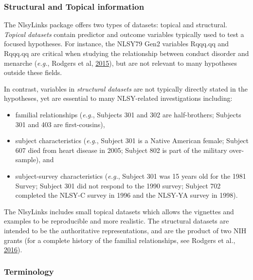 \documentclass[smallextended]{svjour3}       %
\providecommand{\tightlist}{%
  \setlength{\itemsep}{0pt}\setlength{\parskip}{0pt}}
\begin{document}
\hypertarget{structural-and-topical-information}{%
\subsubsection{Structural and Topical
information}\label{structural-and-topical-information}}

The NlsyLinks package offers two types of datasets: topical and
structural. \emph{Topical datasets} contain predictor and outcome
variables typically used to test a focused hypotheses. For instance, the
NLSY79 Gen2 variables Rqqq.qq and Rqqq.qq are critical when studying the
relationship between conduct disorder and menarche (\emph{e.g.}, Rodgers
et al,
\href{http://link.springer.com/article/10.1007/s10519-014-9676-4}{2015}),
but are not relevant to many hypotheses outside these fields.

In contrast, variables in \emph{structural datasets} are not typically
directly stated in the hypotheses, yet are essential to many
NLSY-related investigations including:

\begin{itemize}
\tightlist
\item
  familial relationships (\emph{e.g.}, Subjects 301 and 302 are
  half-brothers; Subjects 301 and 403 are first-cousins),
\item
  subject characteristics (\emph{e.g.}, Subject 301 is a Native American
  female; Subject 607 died from heart disease in 2005; Subject 802 is
  part of the military over-sample), and
\item
  subject-survey characteristics (\emph{e.g.}, Subject 301 was 15 years
  old for the 1981 Survey; Subject 301 did not respond to the 1990
  survey; Subject 702 completed the NLSY-C survey in 1996 and the
  NLSY-YA survey in 1998).
\end{itemize}

The NlsyLinks includes small topical datasets which allows the vignettes
and examples to be reproducible and more realistic. The structural
datasets are intended to be the authoritative representations, and are
the product of two NIH grants (for a complete history of the familial
relationships, see Rodgers et al.,
\href{http://link.springer.com/article/10.1007\%2Fs10519-016-9785-3}{2016}).

\hypertarget{terminology}{%
\subsubsection{Terminology}\label{terminology}}
\end{document}
